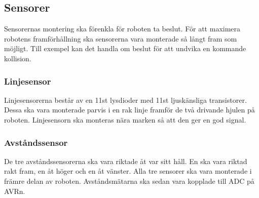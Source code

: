\subsection{Sensorer}
Sensorernas montering ska förenkla för roboten ta beslut. För att maximera robotens framförhållning ska sensorerna vara monterade så långt fram som möjligt. Till exempel kan det handla om beslut för att undvika en kommande kollision.

\subsubsection{Linjesensor}
Linjesensorerna består av en 11st lysdioder med 11st ljuskänsliga transistorer. Dessa ska vara monterade parvis i en rak linje framför de två drivande hjulen på roboten. Linjesensorn ska monteras nära marken så att den ger en god signal.

\subsubsection{Avståndssensor}
De tre avståndssensorerna ska vara riktade åt var sitt håll. En ska vara riktad rakt fram, en åt höger och en åt vänster. Alla tre sensorer ska vara monterade i främre delan av roboten. Avståndsmätarna ska sedan vara kopplade till ADC på AVRn.